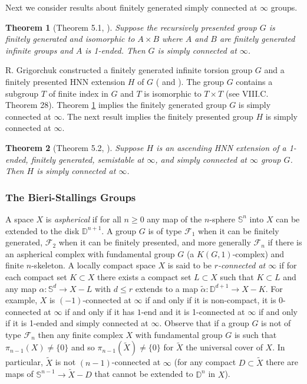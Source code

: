 \documentclass[12pt]{article}
\newtheorem{theorem}{Theorem}[subsection]
\begin{document}
Next we consider results about finitely generated simply connected at $\infty$ groups. 

\begin{theorem} [Theorem 5.1, \cite{M6}] \label{sc} 
Suppose the recursively presented group $G$ is finitely generated and isomorphic to $A\times B$ where $A$ and $B$ are finitely generated infinite groups and $A$ is 1-ended. Then $G$ is simply connected at $\infty$.
\end{theorem}

R. Grigorchuk constructed a finitely generated infinite torsion group $G$ and a finitely presented HNN extension $H$ of $G$ (\cite{GR1} and \cite{GR2}).   The group $G$ contains a subgroup $T$ of finite index in $G$ and $T$ is isomorphic to $T\times T$ (see \cite{dlH00} VIII.C. Theorem 28). Theorem \ref{sc} implies the finitely generated group $G$ is simply connected at $\infty$. The next result implies the finitely presented group $H$ is simply connected at $\infty$.

\begin{theorem} [Theorem 5.2, \cite{M6}] \label{hnn} 
Suppose $H$ is an ascending HNN extension of a 1-ended, finitely generated, semistable at $\infty$, and simply connected at $\infty$ group $G$. Then $H$ is simply connected at $\infty$. 
\end{theorem}

\subsubsection{The Bieri-Stallings Groups}\label{BSgps}

A space $X$ is {\it aspherical} if for all $n\geq 0$ any map of the $n$-sphere $\mathbb S^n$ into $X$ can be extended to the disk $\mathbb D^{n+1}$. A group $G$  is of type $\mathcal F_1$ when it can be finitely generated, $\mathcal F_2$ when it can be finitely
presented, and more generally $\mathcal F_n$ if there is an aspherical complex with fundamental group $G$ (a $K(G,1)$-complex) and finite $n$-skeleton.
A locally compact space $X$ is said to be {\it $r$-connected at $\infty$} if  for each compact set $K\subset  X$ there exists a compact set $L\subset X$ such that $K\subset L$ and any map $\alpha:\mathbb S^d\to X-L$ with $d\leq r$ extends to a map $\tilde \alpha : \mathbb D^{d+1}  \to  X -K$. For example, $X$ is $(-1)$-connected at $\infty$ if and only if it is non-compact, it is $0$-connected at $\infty$ if and only if it has $1$-end and it is 1-connected at $\infty$ if and only if it is 1-ended and simply connected at $\infty$.  Observe that if a group $G$ is not of type $\mathcal F_n$ then any finite complex $X$ with fundamental group $G$ is such that $\pi_{n-1}(X)\ne \{0\}$ and so $\pi_{n-1}(\tilde X)\ne \{0\}$ for $\tilde X$ the universal cover of $X$. In particular, $\tilde X$ is not $(n-1)$-connected at $\infty$ (for any compact $D\subset \tilde X$ there are maps of $\mathbb S^{n-1}\to \tilde X-D$ that cannot be extended to $\mathbb D^{n}$ in $X$). 
\end{document}
